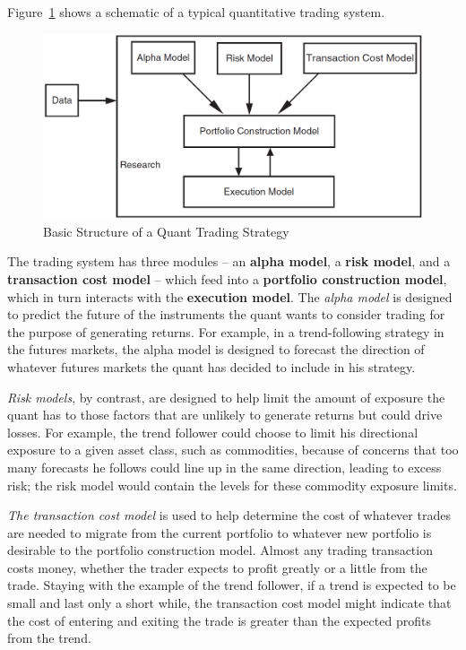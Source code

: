 \documentclass[11pt]{report}
\begin{document}
		Figure~\ref{fig:quantsys} shows a schematic of a typical quantitative trading system.

		\begin{figure}[htbp]
			\centering
			\includegraphics[width=.9\textwidth]{quantsys.png}
			\caption{Basic Structure of a Quant Trading Strategy}
			\label{fig:quantsys}
		\end{figure}

		The trading system has three modules -- an \textbf{alpha model}, a \textbf{risk model}, and a \textbf{transaction cost model} -- which feed into a \textbf{portfolio construction model}, which in turn interacts with the \textbf{execution model}. The \textit{alpha model} is designed to predict the future of the instruments the quant wants to consider trading for the purpose of generating returns. For example, in a trend-following strategy in the futures markets, the alpha model is designed to forecast the direction of whatever futures markets the quant has decided to include in his strategy.

		\textit{Risk models}, by contrast, are designed to help limit the amount of exposure the quant has to those factors that are unlikely to generate returns but could drive losses. For example, the trend follower could choose to limit his directional exposure to a given asset class, such as commodities, because of concerns that too many forecasts he follows could line up in the same direction, leading to excess risk; the risk model would contain the levels for these commodity exposure limits.

		\textit{The transaction cost model} is used to help determine the cost of whatever trades are needed to migrate from the current portfolio to whatever new portfolio is desirable to the portfolio construction model. Almost any trading transaction costs money, whether the trader expects to profit greatly or a little from the trade. Staying with the example of the trend follower, if a trend is expected to be small and last only a short while, the transaction cost model might indicate that the cost of entering and exiting the trade is greater than the expected profits from the trend.
\end{document}
